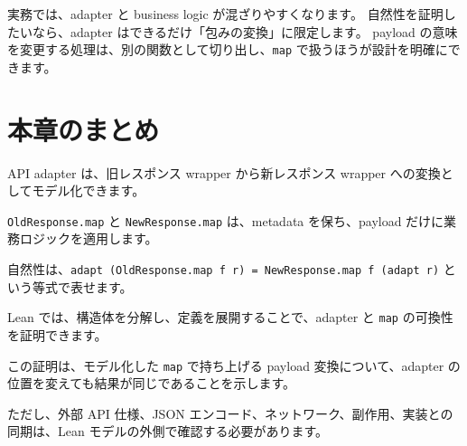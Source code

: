 実務では、adapter と business logic が混ざりやすくなります。
自然性を証明したいなら、adapter はできるだけ「包みの変換」に限定します。
payload の意味を変更する処理は、別の関数として切り出し、\texttt{map} で扱うほうが設計を明確にできます。

\section{本章のまとめ}

API adapter は、旧レスポンス wrapper から新レスポンス wrapper への変換としてモデル化できます。

\texttt{OldResponse.map} と \texttt{NewResponse.map} は、metadata を保ち、payload だけに業務ロジックを適用します。

自然性は、\texttt{adapt (OldResponse.map f r) = NewResponse.map f (adapt r)} という等式で表せます。

Lean では、構造体を分解し、定義を展開することで、adapter と \texttt{map} の可換性を証明できます。

この証明は、モデル化した \texttt{map} で持ち上げる payload 変換について、adapter の位置を変えても結果が同じであることを示します。

ただし、外部 API 仕様、JSON エンコード、ネットワーク、副作用、実装との同期は、Lean モデルの外側で確認する必要があります。
